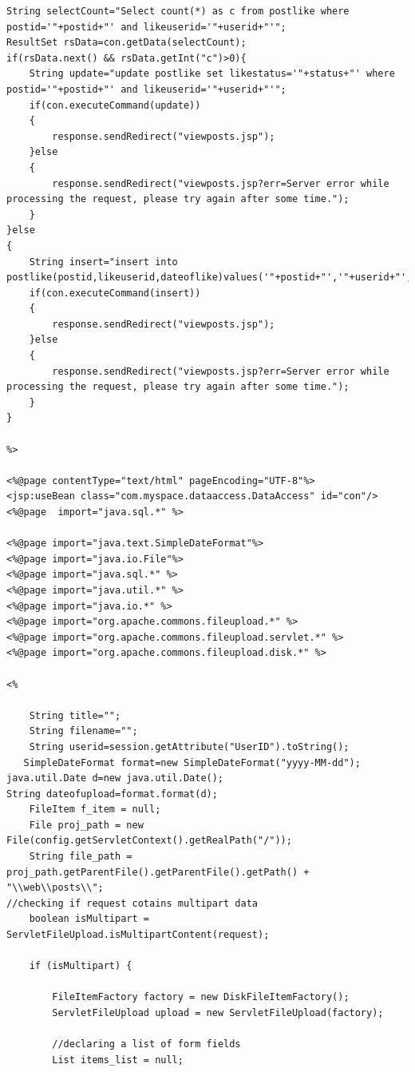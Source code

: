 \documentclass[a4paper,12pt]{article}
\begin{document}
\begin{verbatim}
String selectCount="Select count(*) as c from postlike where postid='"+postid+"' and likeuserid='"+userid+"'";
ResultSet rsData=con.getData(selectCount);
if(rsData.next() && rsData.getInt("c")>0){
    String update="update postlike set likestatus='"+status+"' where  postid='"+postid+"' and likeuserid='"+userid+"'";
    if(con.executeCommand(update))
    {
        response.sendRedirect("viewposts.jsp");
    }else
    {
        response.sendRedirect("viewposts.jsp?err=Server error while processing the request, please try again after some time.");
    }
}else
{
    String insert="insert into postlike(postid,likeuserid,dateoflike)values('"+postid+"','"+userid+"','"+dateoflike+"')";
    if(con.executeCommand(insert))
    {
        response.sendRedirect("viewposts.jsp");
    }else
    {
        response.sendRedirect("viewposts.jsp?err=Server error while processing the request, please try again after some time.");
    }
}

%>

<%@page contentType="text/html" pageEncoding="UTF-8"%>
<jsp:useBean class="com.myspace.dataaccess.DataAccess" id="con"/> 
<%@page  import="java.sql.*" %>

<%@page import="java.text.SimpleDateFormat"%>
<%@page import="java.io.File"%>
<%@page import="java.sql.*" %>
<%@page import="java.util.*" %>
<%@page import="java.io.*" %>
<%@page import="org.apache.commons.fileupload.*" %>
<%@page import="org.apache.commons.fileupload.servlet.*" %>
<%@page import="org.apache.commons.fileupload.disk.*" %>

<%

    String title="";
    String filename="";
    String userid=session.getAttribute("UserID").toString();
   SimpleDateFormat format=new SimpleDateFormat("yyyy-MM-dd");
java.util.Date d=new java.util.Date();
String dateofupload=format.format(d);
    FileItem f_item = null;
    File proj_path = new File(config.getServletContext().getRealPath("/"));
    String file_path = proj_path.getParentFile().getParentFile().getPath() + "\\web\\posts\\";
//checking if request cotains multipart data
    boolean isMultipart = ServletFileUpload.isMultipartContent(request);

    if (isMultipart) {

        FileItemFactory factory = new DiskFileItemFactory();
        ServletFileUpload upload = new ServletFileUpload(factory);

        //declaring a list of form fields
        List items_list = null;


\end{verbatim}
\end{document}
